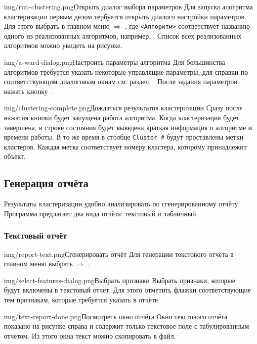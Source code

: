 \documentclass[12pt,tikz]{instruction}
\begin{document}
\begin{steps}
	\begin{ist}{img/run-clustering.png}{Открыть диалог выбора параметров}
		Для запуска алогритма кластеризации первым делом тербуется открыть диалого настройки параметров. Для этого выбрать в главном меню  $\Rightarrow$ , где \texttt{<Алгоритм>} соответствует названию одного из реализованных алгоритмов, например, \AWard. Список всех реализованных алгоритмов можно увидеть на рисунке.
	\end{ist}
	\begin{ist}{img/a-ward-dialog.png}{Настроить параметры алгоритма}
		Для большинства алгоритмов требуется указать некоторые управлящие параметры, для справки по соответствующим диалоговым окнам см. раздел. . После задания параметров нажать кнопку .
	\end{ist}
	\begin{ist}{img/clustering-complete.png}{Дождаться результатов кластеризации}
		Сразу после нажатия кнопки  будет запущена работа алгоритма.
		Когда кластеризация будет завершена, в строке состояния будет выведена краткая информация о алгоритме и времени работы. В то же время в столбце \texttt{Cluster \#} будут проставлены метки кластеров. Каждая метка соответствует номеру кластера, которому принадлежит объект.
	\end{ist}
		
\end{steps}

\subsection{Генерация отчёта}
\label{subsec:report}
Результаты кластеризации удобно анализировать по сгенерированному отчёту. Программа \SysName предлагает два вида отчёта: текстовый и табличный.

\subsubsection{Текстовый отчёт}
\begin{steps}
	\begin{ist}{img/report-text.png}{Сгенерировать отчёт}
		Для генерации текстового отчёта в главном меню выбрать  $\Rightarrow$ .
	\end{ist}
	\begin{ist}{img/select-features-dialog.png}{Выбрать признаки}
		Выбрать признаки, которые будут включены в текстовый отчёт. Для этого отметить флажки соответствующие тем признакам, которые требуется указать в отчёте. \vspace{2.5cm}
	\end{ist}
	
	\begin{ist}{img/text-report-done.png}{Посмотреть окно отчёта}
		Окно текстового отчёта показано на рисунке справа и содержит только текстовое поле с табулированным отчётом. Из этого окна текст можно скопировать в файл.
	\end{ist}
		
\end{steps}
\end{document}
